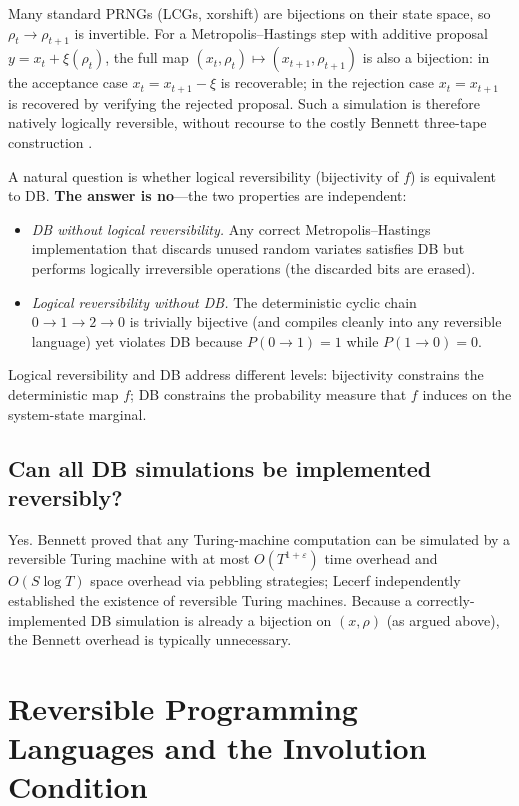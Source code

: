 \documentclass[11pt,a4paper]{article}
\begin{document}
Many standard PRNGs (LCGs, xorshift) are bijections on their state space, so $\rho_t \to
\rho_{t+1}$ is invertible.  For a Metropolis--Hastings step with additive proposal
$y = x_t + \xi(\rho_t)$, the full map $(x_t,\rho_t)\mapsto(x_{t+1},\rho_{t+1})$ is also a
bijection: in the acceptance case $x_t = x_{t+1} - \xi$ is recoverable; in the rejection case
$x_t = x_{t+1}$ is recovered by verifying the rejected proposal.  Such a simulation is therefore
natively logically reversible, without recourse to the costly Bennett three-tape
construction \cite{bennett1989}.

A natural question is whether logical reversibility (bijectivity of $f$) is equivalent to DB.
\textbf{The answer is no}---the two properties are independent:
\begin{itemize}
  \item \textit{DB without logical reversibility.}  Any correct Metropolis--Hastings
        implementation that discards unused random variates satisfies DB but performs logically
        irreversible operations (the discarded bits are erased).
  \item \textit{Logical reversibility without DB.}  The deterministic cyclic chain
        $0\to1\to2\to0$ is trivially bijective (and compiles cleanly into any reversible language)
        yet violates DB because $P(0\to1)=1$ while $P(1\to0)=0$.
\end{itemize}
Logical reversibility and DB address different levels: bijectivity constrains the deterministic
map $f$; DB constrains the probability measure that $f$ induces on the system-state marginal.

\subsection*{Can all DB simulations be implemented reversibly?}

Yes.  Bennett \cite{bennett1973,bennett1989} proved that any Turing-machine computation can be
simulated by a reversible Turing machine with at most $O(T^{1+\varepsilon})$ time overhead and
$O(S\log T)$ space overhead via pebbling strategies; Lecerf \cite{lecerf1963} independently
established the existence of reversible Turing machines.  Because a correctly-implemented DB
simulation is already a bijection on $(x,\rho)$ (as argued above), the Bennett overhead is
typically unnecessary.

\section{Reversible Programming Languages and the Involution Condition}
\end{document}
